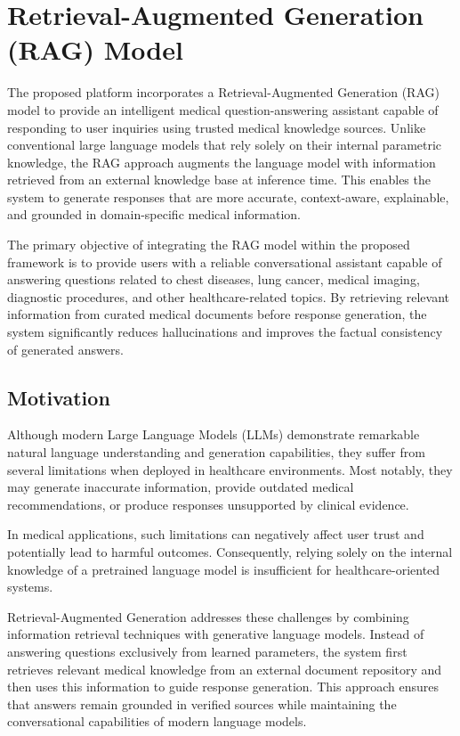 \section{Retrieval-Augmented Generation (RAG) Model}

The proposed platform incorporates a Retrieval-Augmented Generation (RAG) model to provide an intelligent medical question-answering assistant capable of responding to user inquiries using trusted medical knowledge sources. Unlike conventional large language models that rely solely on their internal parametric knowledge, the RAG approach augments the language model with information retrieved from an external knowledge base at inference time. This enables the system to generate responses that are more accurate, context-aware, explainable, and grounded in domain-specific medical information.

The primary objective of integrating the RAG model within the proposed framework is to provide users with a reliable conversational assistant capable of answering questions related to chest diseases, lung cancer, medical imaging, diagnostic procedures, and other healthcare-related topics. By retrieving relevant information from curated medical documents before response generation, the system significantly reduces hallucinations and improves the factual consistency of generated answers.

\subsection{Motivation}

Although modern Large Language Models (LLMs) demonstrate remarkable natural language understanding and generation capabilities, they suffer from several limitations when deployed in healthcare environments. Most notably, they may generate inaccurate information, provide outdated medical recommendations, or produce responses unsupported by clinical evidence.

In medical applications, such limitations can negatively affect user trust and potentially lead to harmful outcomes. Consequently, relying solely on the internal knowledge of a pretrained language model is insufficient for healthcare-oriented systems.

Retrieval-Augmented Generation addresses these challenges by combining information retrieval techniques with generative language models. Instead of answering questions exclusively from learned parameters, the system first retrieves relevant medical knowledge from an external document repository and then uses this information to guide response generation. This approach ensures that answers remain grounded in verified sources while maintaining the conversational capabilities of modern language models.


